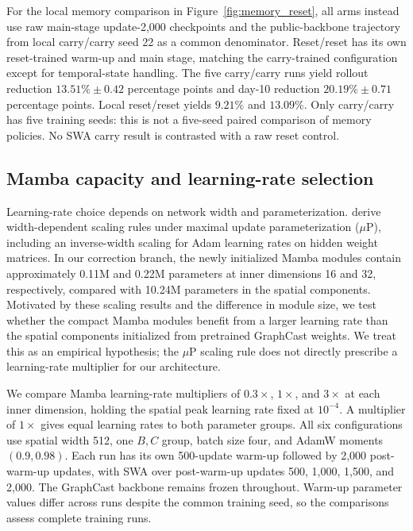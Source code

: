 \documentclass{article}
\newcommand{\vfourchange}[1]{{\color{blue}#1}}
\begin{document}
\vfourchange{For the local memory comparison in Figure~\ref{fig:memory_reset}, all arms instead use raw main-stage update-2,000 checkpoints and the public-backbone trajectory from local carry/carry seed 22 as a common denominator. Reset/reset has its own reset-trained warm-up and main stage, matching the carry-trained configuration except for temporal-state handling. The five carry/carry runs yield rollout reduction $13.51\%\pm0.42$ percentage points and day-10 reduction $20.19\%\pm0.71$ percentage points. Local reset/reset yields $9.21\%$ and $13.09\%$. Only carry/carry has five training seeds: this is not a five-seed paired comparison of memory policies. No SWA carry result is contrasted with a raw reset control.}

\subsection{\texorpdfstring{{Mamba capacity and learning-rate selection}}{Mamba capacity and learning-rate selection}}
\label{sec:training_sensitivity}

{Learning-rate choice depends on network width and parameterization. \citet{yang2022tensorprogramsv} derive width-dependent scaling rules under maximal update parameterization ($\mu$P), including an inverse-width scaling for Adam learning rates on hidden weight matrices. In our correction branch, the newly initialized Mamba modules contain approximately 0.11M and 0.22M parameters at inner dimensions 16 and 32, respectively, compared with 10.24M parameters in the spatial components. Motivated by these scaling results and the difference in module size, we test whether the compact Mamba modules benefit from a larger learning rate than the spatial components initialized from pretrained GraphCast weights. We treat this as an empirical hypothesis; the $\mu$P scaling rule does not directly prescribe a learning-rate multiplier for our architecture.}

{We compare Mamba learning-rate multipliers of $0.3\times$, $1\times$, and $3\times$ at each inner dimension, holding the spatial peak learning rate fixed at $10^{-4}$. A multiplier of $1\times$ gives equal learning rates to both parameter groups. All six configurations use spatial width 512, one $B,C$ group, batch size four, and AdamW moments $(0.9,0.98)$. Each run has its own 500-update warm-up followed by 2,000 post-warm-up updates, with SWA over post-warm-up updates 500, 1,000, 1,500, and 2,000. The GraphCast backbone remains frozen throughout. Warm-up parameter values differ across runs despite the common training seed, so the comparisons assess complete training runs.}
\end{document}
